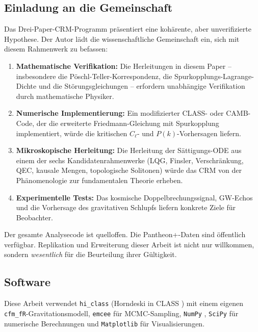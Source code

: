 \documentclass[11pt,a4paper]{article}
\begin{document}
\subsection{Einladung an die Gemeinschaft}

Das Drei-Paper-CRM-Programm pr\"asentiert eine koh\"arente, aber unverifizierte Hypothese. Der Autor l\"adt die wissenschaftliche Gemeinschaft ein, sich mit diesem Rahmenwerk zu befassen:

\begin{enumerate}
\item \textbf{Mathematische Verifikation:} Die Herleitungen in diesem Paper -- insbesondere die P\"oschl-Teller-Korrespondenz, die Spurkopplungs-Lagrange-Dichte und die St\"orungsgleichungen -- erfordern unabh\"angige Verifikation durch mathematische Physiker.
\item \textbf{Numerische Implementierung:} Ein modifizierter CLASS- oder CAMB-Code, der die erweiterte Friedmann-Gleichung mit Spurkopplung implementiert, w\"urde die kritischen $C_\ell$- und $P(k)$-Vorhersagen liefern.
\item \textbf{Mikroskopische Herleitung:} Die Herleitung der S\"attigungs-ODE aus einem der sechs Kandidatenrahmenwerke (LQG, Finsler, Verschr\"ankung, QEC, kausale Mengen, topologische Solitonen) w\"urde das CRM von der Ph\"anomenologie zur fundamentalen Theorie erheben.
\item \textbf{Experimentelle Tests:} Das kosmische Doppelbrechungssignal, GW-Echos und die Vorhersage des gravitativen Schlupfs liefern konkrete Ziele f\"ur Beobachter.
\end{enumerate}

\noindent Der gesamte Analysecode ist quelloffen. Die Pantheon+-Daten sind \"offentlich verf\"ugbar. Replikation und Erweiterung dieser Arbeit ist nicht nur willkommen, sondern \textit{wesentlich} f\"ur die Beurteilung ihrer G\"ultigkeit.


\subsection*{Software}

Diese Arbeit verwendet \texttt{hi\_class} \cite{Zumalacarregui2017} (Horndeski in CLASS \cite{Blas2011}) mit einem eigenen \texttt{cfm\_fR}-Gravitationsmodell, \texttt{emcee} \cite{ForemanMackey2013} f\"ur MCMC-Sampling, \texttt{NumPy} \cite{Harris2020}, \texttt{SciPy} \cite{Virtanen2020} f\"ur numerische Berechnungen und \texttt{Matplotlib} \cite{Hunter2007} f\"ur Visualisierungen.
\end{document}
